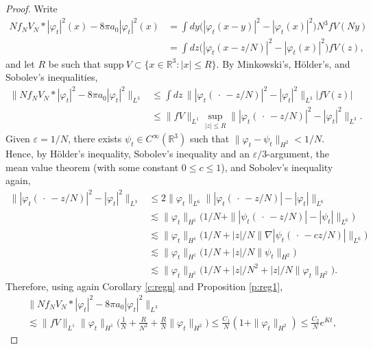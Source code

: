 \documentclass[11pt,a4paper,draft,DIV11]{scrartcl}	%
\newcommand{\R}{\mathds{R}}
\begin{document}
\begin{proof}
  Write
  \begin{align*}
    N f_N V_N * |\varphi_t|^2(x) - 8 \pi a_0 |\varphi_t|^2(x) & = \int dy
    \big( |\varphi_t(x-y)|^2 - |\varphi_t(x)|^2 \big) N^3 fV(Ny) \\
    & = \int dz \big( |\varphi_t(x-z/N)|^2 - |\varphi_t(x)|^2 \big) fV(z),
  \end{align*}
  and let $R$ be such that $\text{supp} \ V \subset \{ x \in \R^3 : |x| \le
  R \}$. By Minkowski's, H\"older's, and Sobolev's inequalities,
  \begin{align*}
    \| N f_N V_N * |\varphi_t|^2 - 8 \pi a_0 |\varphi_t|^2 \|_{L^3} & \le
    \int dz \, \| |\varphi_t(\, \cdot \, -z/N)|^2 - |\varphi_t|^2 \|_{L^3}
    |fV(z)| \\
    & \le \| fV \|_{L^1} \sup_{|z| \le R} \| |\varphi_t(\, \cdot \, -
    z/N)|^2 - |\varphi_t|^2 \|_{L^3}.
  \end{align*}
  Given $\varepsilon = 1/N$, there exists $\psi_t \in C^\infty(\R^3)$ such
  that $\| \varphi_t - \psi_t \|_{H^2} < 1/N$. Hence, by H\"older's
  inequality, Sobolev's inequality and an $\varepsilon/3$-argument, the mean
  value theorem (with some constant $0 \le c \le 1$), and Sobolev's
  inequality again,
  \begin{align*}
    \| |\varphi_t(\, \cdot \, - z/N)|^2 - |\varphi_t|^2 \|_{L^3} & \le 2 \|
    \varphi_t \|_{L^6} \| |\varphi_t(\, \cdot \, - z/N)| - |\varphi_t|
    \|_{L^6} \\
    & \apprle \| \varphi_t \|_{H^1} \big( 1/N + \| |\psi_t(\, \cdot \, - z/N)|
    - |\psi_t| \|_{L^6} \big) \\
    & \apprle \| \varphi_t \|_{H^1} \big( 1/N + |z|/N \| \nabla |\psi_t(\,
    \cdot \, - c z/N)| \|_{L^6} \big) \\
    & \apprle \| \varphi_t \|_{H^1} \big( 1/N + |z|/N \| \psi_t \|_{H^2}
    \big) \\
    & \apprle \| \varphi_t \|_{H^1} \big( 1/N + |z|/N^2 + |z|/N \| \varphi_t
    \|_{H^2} \big).
  \end{align*}
  Therefore, using again Corollary \ref{c:regn} and Proposition \ref{p:reg1},
  \begin{align*}
    & \| N f_N V_N * |\varphi_t|^2 - 8 \pi a_0 |\varphi_t|^2 \|_{L^3} \\
    & \apprle \| fV \|_{L^1} \| \varphi_t \|_{H^1} \Big( \frac{1}{N} +
    \frac{R}{N^2} + \frac{R}{N} \| \varphi_t \|_{H^2} \Big) \le
    \frac{C_1}{N}(1 + \| \varphi_t \|_{H^2}) \le \frac{C_2}{N} e^{Kt},
  \end{align*}

\end{proof}
\end{document}

